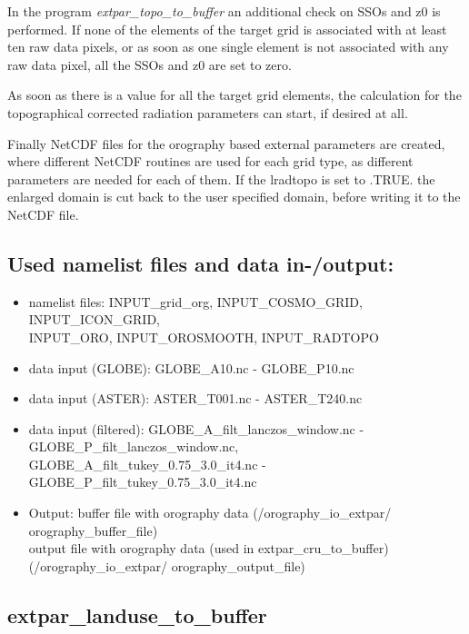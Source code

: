 \documentclass[a4paper,10pt,DIV14,BCOR1cm,titlepage,twoside]{scrartcl}
\begin{document}
In the program \textit{extpar\_topo\_to\_buffer} an additional check on SSOs and z0 is performed. If none of the elements of the target grid is associated with at least ten raw data pixels, or as soon as one single element is not associated with any raw data pixel, all the SSOs and z0 are set to zero.\par\medskip\noindent
As soon as there is a value for all the target grid elements, the calculation for the topographical corrected radiation parameters can start, if desired at all.\par\medskip\noindent
Finally NetCDF files for the orography based external parameters are created, where different NetCDF routines are used for each grid type, as different parameters are needed for each of them. If the lradtopo is set to .TRUE. the enlarged domain is cut back to the user specified domain, before writing it to the NetCDF file.\par\medskip\noindent
\subsection{Used namelist files and data in-/output:}
\begin{itemize}
 \item namelist files: INPUT\_grid\_org, INPUT\_COSMO\_GRID, INPUT\_ICON\_GRID, \\
     INPUT\_ORO, INPUT\_OROSMOOTH, INPUT\_RADTOPO
\item data input (GLOBE): GLOBE\_A10.nc - GLOBE\_P10.nc 
\item data input (ASTER): ASTER\_T001.nc - ASTER\_T240.nc
\item data input (filtered): GLOBE\_A\_filt\_lanczos\_window.nc - GLOBE\_P\_filt\_lanczos\_window.nc, \\
    GLOBE\_A\_filt\_tukey\_0.75\_3.0\_it4.nc - GLOBE\_P\_filt\_tukey\_0.75\_3.0\_it4.nc
\item Output: buffer file with orography data (/orography\_io\_extpar/ orography\_buffer\_file) \\
              output file with orography data (used in extpar\_cru\_to\_buffer)\\
              (/orography\_io\_extpar/ orography\_output\_file)
\end{itemize}

\subsection{extpar\_landuse\_to\_buffer}\label{extpar_landuse_to_buffer}
\end{document}
